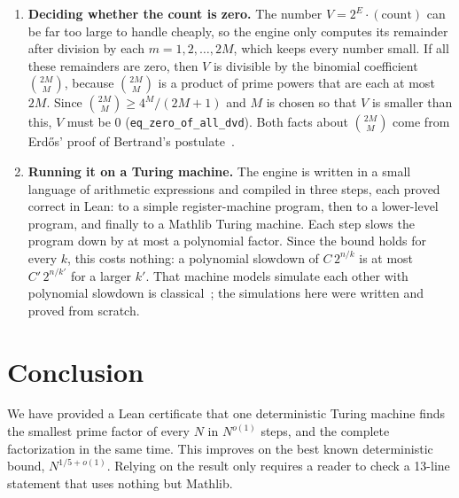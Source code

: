 \documentclass[11pt]{article}
\newcommand{\code}[1]{\texttt{#1}}
\begin{document}
\begin{enumerate}
  nodes into fewer, larger groups chosen so that the shared bits are spread evenly between groups; such a
  grouping always exists, and our machine finds one by trying them all. Second, it arranges the groups in a
  grid and uses two algebraic identities from~\cite{Cla26} to rewrite the value as a sum of smaller problems,
  each costing a fixed fraction less in the exponent. After $\ell$ rounds it finishes by direct enumeration,
  obtaining the count multiplied by a known power of two, $2^E$. More rounds give a smaller exponent. Our
  machine computes $\ell$ from $n$ while it runs, and $\ell$ grows without bound as $n$ grows, so a single
  machine runs within $C_k\,2^{n/k}$ steps for every $k$ (\code{uni\_exp}). We re-proved the engine instead of
  importing it, in a variant that writes every table out in full and does all arithmetic modulo small numbers.
\item \textbf{Deciding whether the count is zero.} The number $V=2^E\cdot(\text{count})$ can be far too large
  to handle cheaply, so the engine only computes its remainder after division by each $m=1,2,\dots,2M$, which
  keeps every number small. If all these remainders are zero, then $V$ is divisible by the binomial coefficient
  $\binom{2M}{M}$, because $\binom{2M}{M}$ is a product of prime powers that are each at most $2M$. Since
  $\binom{2M}{M}\ge 4^M/(2M+1)$ and $M$ is chosen so that $V$ is smaller than this, $V$ must be $0$
  (\code{eq\_zero\_of\_all\_dvd}). Both facts about $\binom{2M}{M}$ come from Erd\H{o}s' proof of Bertrand's
  postulate~\cite{Erd32}.
\item \textbf{Running it on a Turing machine.} The engine is written in a small language of arithmetic
  expressions and compiled in three steps, each proved correct in Lean: to a simple register-machine program,
  then to a lower-level program, and finally to a Mathlib Turing machine. Each step slows the program down by
  at most a polynomial factor. Since the bound holds for every $k$, this costs nothing: a polynomial slowdown of
  $C\,2^{n/k}$ is at most $C'\,2^{n/k'}$ for a larger $k'$. That machine models simulate each other with
  polynomial slowdown is classical~\cite{CR73,vEB90}; the simulations here were written and proved from
  scratch.
\end{enumerate}

\section{Conclusion}

We have provided a Lean certificate that one deterministic Turing machine finds the smallest prime factor of every
$N$ in $N^{o(1)}$ steps, and the complete factorization in the same time. This
improves on the best known deterministic bound, $N^{1/5+o(1)}$. Relying on the result only requires a reader to check
a 13-line statement that uses nothing but Mathlib. 
\end{document}

